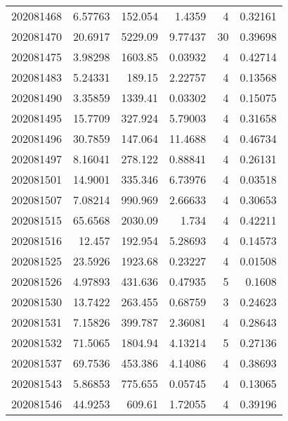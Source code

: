 \begin{tabular}{rrrrrr}
 202081468 &          6.57763 &      152.054  &            1.4359  &           4 & 0.32161 \\
 202081470 &         20.6917  &     5229.09   &            9.77437 &          30 & 0.39698 \\
 202081475 &          3.98298 &     1603.85   &            0.03932 &           4 & 0.42714 \\
 202081483 &          5.24331 &      189.15   &            2.22757 &           4 & 0.13568 \\
 202081490 &          3.35859 &     1339.41   &            0.03302 &           4 & 0.15075 \\
 202081495 &         15.7709  &      327.924  &            5.79003 &           4 & 0.31658 \\
 202081496 &         30.7859  &      147.064  &           11.4688  &           4 & 0.46734 \\
 202081497 &          8.16041 &      278.122  &            0.88841 &           4 & 0.26131 \\
 202081501 &         14.9001  &      335.346  &            6.73976 &           4 & 0.03518 \\
 202081507 &          7.08214 &      990.969  &            2.66633 &           4 & 0.30653 \\
 202081515 &         65.6568  &     2030.09   &            1.734   &           4 & 0.42211 \\
 202081516 &         12.457   &      192.954  &            5.28693 &           4 & 0.14573 \\
 202081525 &         23.5926  &     1923.68   &            0.23227 &           4 & 0.01508 \\
 202081526 &          4.97893 &      431.636  &            0.47935 &           5 & 0.1608  \\
 202081530 &         13.7422  &      263.455  &            0.68759 &           3 & 0.24623 \\
 202081531 &          7.15826 &      399.787  &            2.36081 &           4 & 0.28643 \\
 202081532 &         71.5065  &     1804.94   &            4.13214 &           5 & 0.27136 \\
 202081537 &         69.7536  &      453.386  &            4.14086 &           4 & 0.38693 \\
 202081543 &          5.86853 &      775.655  &            0.05745 &           4 & 0.13065 \\
 202081546 &         44.9253  &      609.61   &            1.72055 &           4 & 0.39196 \\

\end{tabular}
